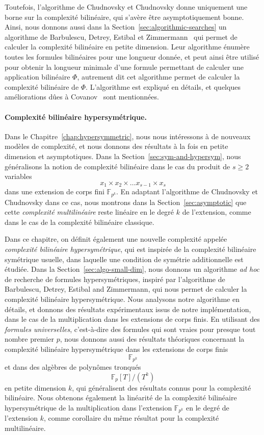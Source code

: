 Toutefois, l'algorithme de Chudnovsky et Chudnovsky donne uniquement une borne
sur la complexité bilinéaire, qui s'avère être asymptotiquement bonne. Ainsi,
nous donnons aussi dans la Section~\ref{sec:algorithmic-searches} un algorithme
de Barbulescu, Detrey, Estibal et Zimmermann~\cite{BDEZ12} qui permet de
calculer la complexité bilinéaire en petite dimension. Leur algorithme énumère
toutes les formules bilinéaires pour une longueur donnée, et peut ainsi être
utilisé pour obtenir la longueur minimale d'une formule permettant de calculer
une application bilinéaire $\Phi$, autrement dit cet algorithme permet de
calculer la complexité bilinéaire de $\Phi$. L'algorithme est expliqué en
détails, et quelques améliorations dûes à Covanov~\cite{Covanov19} sont
mentionnées.

\paragraph{Complexité bilinéaire hypersymétrique.} Dans le
Chapitre~\ref{chap:hypersymmetric}, nous nous intéressons à de nouveaux modèles
de complexité, et nous donnons des résultats à la fois en petite dimension et
asymptotiques. Dans la Section~\ref{sec:sym-and-hypersym}, nous généralisons
la notion de complexité bilinéaire dans le cas du produit de $s\geq2$ variables
\[
  x_1\times x_2 \times\dots x_{s-1}\times x_s
\]
dans une extension de corps fini $\mathbb{F}_{p^{k}}$. En adaptant l'algorithme
de Chudnovsky et Chudnovsky dans ce cas, nous montrons dans la
Section~\ref{sec:asymptotic} que cette \emph{complexité multilinéaire} reste
linéaire en le degré $k$ de l'extension, comme dans le cas de la complexité
bilinéaire classique.

Dans ce chapitre, on définit également une nouvelle complexité appelée
\emph{complexité bilinéaire hypersymétrique}, qui est inspirée de la complexité
bilinéaire symétrique usuelle, dans laquelle une condition de symétrie
additionnelle est étudiée. Dans la Section~\ref{sec:algo-small-dim}, nous
donnons un algorithme \emph{ad hoc} de recherche
de formules hypersymétriques, inspiré par l'algorithme de Barbulescu, Detrey,
Estibal and Zimmermann, qui nous permet de calculer la complexité bilinéaire
hypersymétrique. Nous analysons notre algorithme en détails, et donnons des
résultats expérimentaux issus de notre implémentation, dans le cas de la
multiplication dans les extensions de corps finis. En utilisant des
\emph{formules universelles}, c'est-à-dire des formules qui sont vraies pour
presque tout nombre premier $p$, nous donnons aussi des résultats théoriques
concernant la complexité bilinéaire hypersymétrique dans les extensions de corps
finis
\[
  \mathbb{F}_{p^{k}}
\]
et dans des algèbres de polynômes tronqués
\[
  \mathbb{F}_p[T]/(T^k)
\]
en petite dimension $k$, qui généralisent des résultats connus pour la
complexité bilinéaire. Nous obtenons également la linéarité de la complexité
bilinéaire hypersymétrique de la multiplication dans l'extension
$\mathbb{F}_{p^{k}}$ en le degré de l'extension $k$, comme corollaire du même
résultat pour la complexité multilinéaire.

